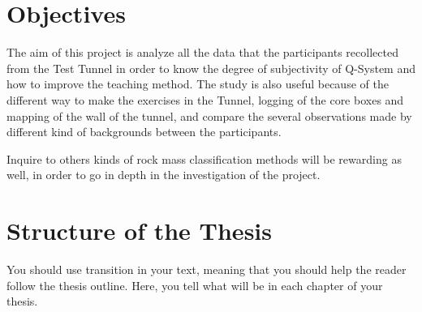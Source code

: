 \section{Objectives}

The aim of this project is analyze all the data that the participants recollected from the Test Tunnel in order to know the degree of subjectivity of Q-System and how to improve the teaching method. The study is also useful because of the different way to make the exercises in the Tunnel, logging of the core boxes and mapping of the wall of the tunnel, and compare the several observations made by different kind of backgrounds between the participants. 

Inquire to others kinds of rock mass classification methods will be rewarding as well, in order to go in depth in the investigation of the project.


\section{Structure of the Thesis}

You should use transition in your text, meaning that you should help
the reader follow the thesis outline. Here, you tell what will be in
each chapter of your thesis. 

